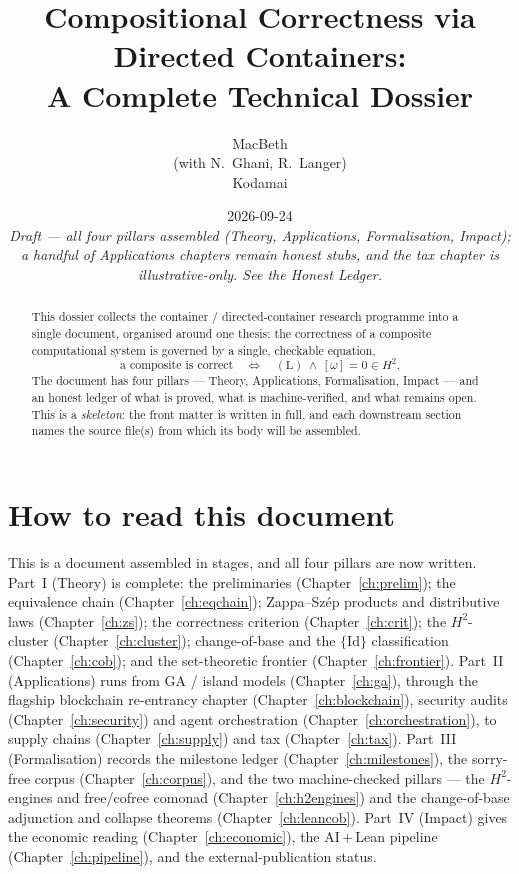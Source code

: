 \documentclass[11pt]{report}
\title{Compositional Correctness via Directed Containers:\\
       A Complete Technical Dossier}
\author{MacBeth \\ \small (with N.~Ghani, R.~Langer) \\ \small Kodamai}
\date{2026-09-24 \\[0.5em] \textit{\small Draft --- all four pillars assembled (Theory, Applications, Formalisation, Impact); a handful of Applications chapters remain honest stubs, and the tax chapter is illustrative-only. See the Honest Ledger.}}
\theoremstyle{plain}
\theoremstyle{definition}
\theoremstyle{remark}
\newcommand{\Hcoh}{H^2}
\begin{document}
\maketitle

\begin{abstract}
\noindent This dossier collects the container / directed-container research
programme into a single document, organised around one thesis: the correctness
of a composite computational system is governed by a single, checkable
equation,
\[
   \text{a composite is correct}\quad\Longleftrightarrow\quad
   (\mathrm{L}) \ \wedge\ [\omega]=0\in \Hcoh .
\]
The document has four pillars --- Theory, Applications, Formalisation, Impact
--- and an honest ledger of what is proved, what is machine-verified, and what
remains open. This is a \emph{skeleton}: the front matter is written in full,
and each downstream section names the source file(s) from which its body will
be assembled.
\end{abstract}

\tableofcontents

\chapter*{How to read this document}

This is a document assembled in stages, and all four pillars are now written.
Part~I (Theory) is complete: the preliminaries (Chapter~\ref{ch:prelim}); the
equivalence chain (Chapter~\ref{ch:eqchain}); Zappa--Sz\'ep products and
distributive laws (Chapter~\ref{ch:zs}); the correctness criterion
(Chapter~\ref{ch:crit}); the $\Hcoh$-cluster (Chapter~\ref{ch:cluster});
change-of-base and the $\{\mathrm{Id}\}$ classification (Chapter~\ref{ch:cob});
and the set-theoretic frontier (Chapter~\ref{ch:frontier}). Part~II
(Applications) runs from GA / island models (Chapter~\ref{ch:ga}), through the
flagship blockchain re-entrancy chapter (Chapter~\ref{ch:blockchain}), security
audits (Chapter~\ref{ch:security}) and agent orchestration
(Chapter~\ref{ch:orchestration}), to supply chains (Chapter~\ref{ch:supply}) and
tax (Chapter~\ref{ch:tax}). Part~III (Formalisation) records the milestone ledger
(Chapter~\ref{ch:milestones}), the sorry-free corpus (Chapter~\ref{ch:corpus}),
and the two machine-checked pillars --- the $\Hcoh$-engines and free/cofree
comonad (Chapter~\ref{ch:h2engines}) and the change-of-base adjunction and
collapse theorems (Chapter~\ref{ch:leancob}). Part~IV (Impact) gives the
economic reading (Chapter~\ref{ch:economic}), the AI\,+\,Lean pipeline
(Chapter~\ref{ch:pipeline}), and the external-publication status.
\end{document}

